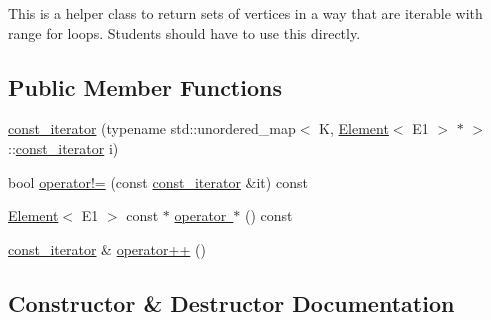 This is a helper class to return sets of vertices in a way that are iterable with range for loops. Students should have to use this directly. \subsection*{Public Member Functions}
\begin{DoxyCompactItemize}
\item 
\mbox{\hyperlink{classbridges_1_1datastructure_1_1_graph_adj_list_1_1_vertex_element_set__listhelper_1_1const__iterator_a023fa89f9e79573104de174f5fbab487}{const\+\_\+iterator}} (typename std\+::unordered\+\_\+map$<$ K, \mbox{\hyperlink{classbridges_1_1datastructure_1_1_element}{Element}}$<$ E1 $>$ $\ast$ $>$\+::\mbox{\hyperlink{classbridges_1_1datastructure_1_1_graph_adj_list_1_1_vertex_element_set__listhelper_1_1const__iterator}{const\+\_\+iterator}} i)
\item 
bool \mbox{\hyperlink{classbridges_1_1datastructure_1_1_graph_adj_list_1_1_vertex_element_set__listhelper_1_1const__iterator_ac7ce05d2bf7491005acf6e4a668cea1b}{operator!=}} (const \mbox{\hyperlink{classbridges_1_1datastructure_1_1_graph_adj_list_1_1_vertex_element_set__listhelper_1_1const__iterator}{const\+\_\+iterator}} \&it) const
\item 
\mbox{\hyperlink{classbridges_1_1datastructure_1_1_element}{Element}}$<$ E1 $>$ const  $\ast$ \mbox{\hyperlink{classbridges_1_1datastructure_1_1_graph_adj_list_1_1_vertex_element_set__listhelper_1_1const__iterator_ac38dbc97be4bfd788306e827ab683211}{operator $\ast$}} () const
\item 
\mbox{\hyperlink{classbridges_1_1datastructure_1_1_graph_adj_list_1_1_vertex_element_set__listhelper_1_1const__iterator}{const\+\_\+iterator}} \& \mbox{\hyperlink{classbridges_1_1datastructure_1_1_graph_adj_list_1_1_vertex_element_set__listhelper_1_1const__iterator_ac1c6d4c3ab7486d648e469b1783f42df}{operator++}} ()
\end{DoxyCompactItemize}


\subsection{Constructor \& Destructor Documentation}
\mbox{\label{classbridges_1_1datastructure_1_1_graph_adj_list_1_1_vertex_element_set__listhelper_1_1const__iterator_a023fa89f9e79573104de174f5fbab487}} 
